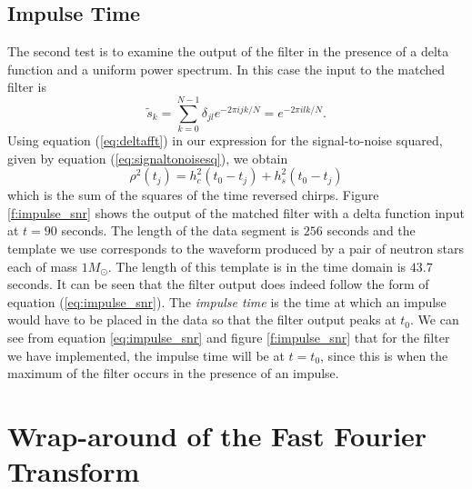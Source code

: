 \subsection{Impulse Time}
\label{ss:impulsetime}

The second test is to examine the output of the filter in the presence of a
delta function and a uniform power spectrum. In this case the input to the
matched filter is
\begin{equation}
\tilde{s}_k = \sum_{k=0}^{N-1} \delta_{jl} e^{-2\pi ijk/N} = e^{-2\pi ilk/N}.
\label{eq:deltafft}
\end{equation}
Using equation (\ref{eq:deltafft}) in our expression for the signal-to-noise
squared, given by equation (\ref{eq:signaltonoisesq}), we obtain
\begin{equation}
\rho^2(t_j) = h_c^2(t_0 - t_j) + h_s^2(t_0 - t_j)
\label{eq:impulse_snr}
\end{equation}
which is the sum of the squares of the time reversed chirps.  Figure
\ref{f:impulse_snr} shows the output of the matched filter with a delta
function input at $t=90$ seconds. The length of the data segment is $256$
seconds and the template we use corresponds to the waveform produced by a pair
of neutron stars each of mass $1 M_\odot$. The length of this template is in
the time domain is $43.7$ seconds.  It can be seen that the filter output does
indeed follow the form of equation (\ref{eq:impulse_snr}). The \emph{impulse
time} is the time at which an impulse would have to be placed in the data so
that the filter output peaks at $t_0$. We can see from equation
\ref{eq:impulse_snr} and figure \ref{f:impulse_snr} that for the filter we
have implemented, the impulse time will be at $t = t_0$, since this is when
the maximum of the filter occurs in the presence of an impulse.

\section{Wrap-around of the Fast Fourier Transform}
\label{s:wraparound}

